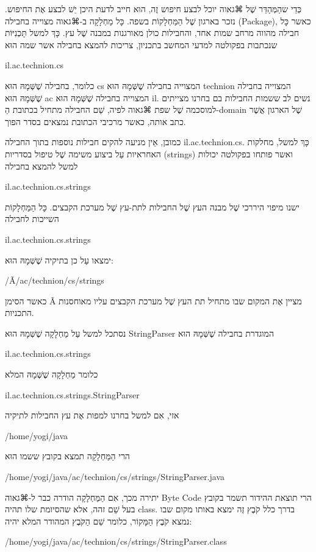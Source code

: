 כְּדֵי שהַמְּהַדֵּר שֶׁל ⌘גאוה יוכל לבצע חיפוש זֶה, הוּא חייב לדעת היכן יֵשׁ לבצע
אֶת החיפוש. נזכר בארגון שֶׁל הַמַּחְלָקוֹת בשפה. כָּל מַחְלָקָה ב-⌘גאוה מצוייה
בחבילה (Package), כאשר כָּל חבילה מהווה מרחב שמות אחד, והחבילות כולן מאורגנות
במבנה שֶׁל עץ. כָּךְ למשל תָּכְנִיּוֹת שנכתבות בפקולטה למדעי המחשב בתכניון,
צריכות להמצא בחבילה אשר שמה הוּא

il.ac.technion.cs

כלומר, בחבילה שֶׁשְּׁמָהּ הוּא cs המצוייה בחבילה שֶׁשְּׁמָהּ הוּא technion
המצוייה בחבילה שֶׁשְּׁמָהּ הוּא ac המצוייה בחבילה שֶׁשְּׁמָהּ הוּא il. נשים לב
ששמות החבילות בם בחרנו מצייתים למוסכמה שֶׁל שפת ⌘גאוה לפיה, שֵׁם החבילה מתחיל
בכתובת הַ-domain שֶׁל הארגון אֲשֶׁר כתב אותה, כאשר מרכיבי הכתובת נמצאים בסדר
הפוך.

כמובן, אֵין מניעה להקים חבילות נוספות בתוך החבילה il.ac.technion.cs. כָּךְ למשל,
מחלקות האחראיות עַל ביצוע משימה שֶׁל טיפול בסדריות (strings) ואשר פותחו בפקולטה
יכולות למשל להמצא בחבילה

il.ac.technion.cs.strings

ישנו מיפוי היררכי שֶׁל מבנה העץ שֶׁל החבילות לתת-עץ שֶׁל מערכת הקבצים. כָּל
הַמַּחְלָקוֹת השייכות לחבילה

 il.ac.technion.cs.strings

ימצאו עַל כן בתיקיה שֶׁשְּׁמָהּ הוּא:

/Ã/ac/technion/cs/strings

כאשר הסימן Ã מציין אֶת המקום שבו מתחיל תת העץ שֶׁל מערכת הקבצים עליו מאוחסנות
התכניות.

נסתכל למשל עַל מַחְלָקָה שֶׁשְּׁמָהּ הוּא StringParser המוגדרת בחבילה
שֶׁשְּׁמָהּ הוּא

 il.ac.technion.cs.strings

כלומר מַחְלָקָה שֶׁשְּׁמָהּ המלא

il.ac.technion.cs.strings.StringParser

אזי, אִם למשל בחרנו למפות אֶת עץ החבילות לתיקיה

 /home/yogi/java

הרי הַמַּחְלָקָה תמצא בקובץ ששמו הוּא

/home/yogi/java/ac/technion/cs/strings/StringParser.java

יתירה מכך, אִם הַמַּחְלָקָה הודרה כבר ל-⌘גאוה Byte Code הרי תוצאת ההידור תשמר
בקובץ בעל שֵׁם זהה, אלא שהסיומת שלו תהיה class. בדרך כלל קֹבֶץ זֶה ימצא באותו
מקום שבו נמצא קֹבֶץ הַמָּקוֹר, כלומר שֵׁם הַקֹּבֶץ המהודר המלא יהיה:

/home/yogi/java/ac/technion/cs/strings/StringParser.class

